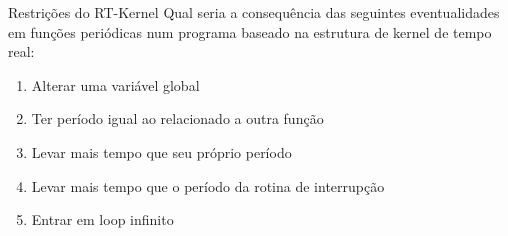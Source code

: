 \documentclass{beamer}
\begin{document}
\begin{frame}[fragile]{Restrições do RT-Kernel}
  \centering
  \large
  Qual seria a consequência das seguintes eventualidades em funções periódicas
  num programa baseado na  estrutura de kernel de tempo real:
  \begin{enumerate}
  \item Alterar uma variável global
  \item Ter período igual ao relacionado a outra função
  \item Levar mais tempo que seu próprio período
  \item Levar mais tempo que o período da rotina de interrupção
  \item Entrar em loop infinito
  \end{enumerate}

\end{frame}
\end{document}
